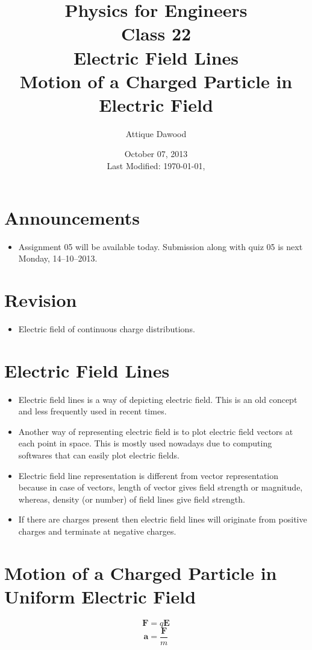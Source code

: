 \documentclass[12pt,a4paper]{article}
\title{\vspace{-3cm}Physics for Engineers\\Class 22\\Electric Field Lines\\Motion of a Charged Particle in Electric Field}
\author{Attique Dawood}
\date{October 07, 2013\\[0.2cm] Last Modified: \today, \currenttime}
\begin{document}
\maketitle
\section{Announcements}
\begin{itemize}
\item Assignment 05 will be available today. Submission along with quiz 05 is next Monday, 14--10--2013.
\end{itemize}
\section{Revision}
\begin{itemize}
\item Electric field of continuous charge distributions.
\end{itemize}
\section{Electric Field Lines}
\begin{itemize}
\item Electric field lines is a way of depicting electric field. This is an old concept and less frequently used in recent times.
\item Another way of representing electric field is to plot electric field vectors at each point in space. This is mostly used nowadays due to computing softwares that can easily plot electric fields.
\item Electric field line representation is different from vector representation because in case of vectors, length of vector gives field strength or magnitude, whereas, density (or number) of field lines give field strength.
\item If there are charges present then electric field lines will originate from positive charges and terminate at negative charges.
\end{itemize}
\section{Motion of a Charged Particle in Uniform Electric Field}
\begin{equation}
\textbf{F}=q\textbf{E}
\end{equation}
\begin{equation}
\textbf{a}=\dfrac{\textbf{F}}{m}
\end{equation}
\end{document}
